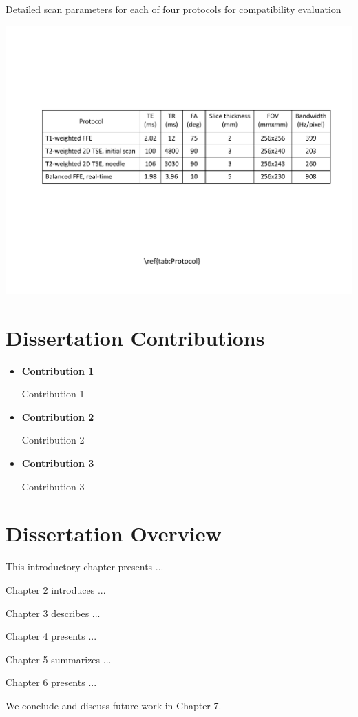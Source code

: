 \begin{table}[htb]
  \begin{center}
\caption[Scan parameters for compatibility evaluation.]{Detailed scan parameters for each of four protocols for compatibility evaluation}
\label{tab:Protocol}
  \end{center}
\includegraphics[width=150mm]{fig/chap1/protocol.pdf}
\end{table}
\vspace{-2mm}

\section{Dissertation Contributions}
\label{sec:Contributions}

\begin{itemize}
\item
\textbf{Contribution 1}

Contribution 1

\item
\textbf{Contribution 2}

Contribution 2

\item
\textbf{Contribution 3}

Contribution 3

\end{itemize}


\section{Dissertation Overview}
\label{sec:Overview}

This introductory chapter presents ...

Chapter 2 introduces ...

Chapter 3 describes ...

Chapter 4 presents ...

Chapter 5 summarizes ...

Chapter 6 presents ...

We conclude and discuss future work in Chapter 7. 